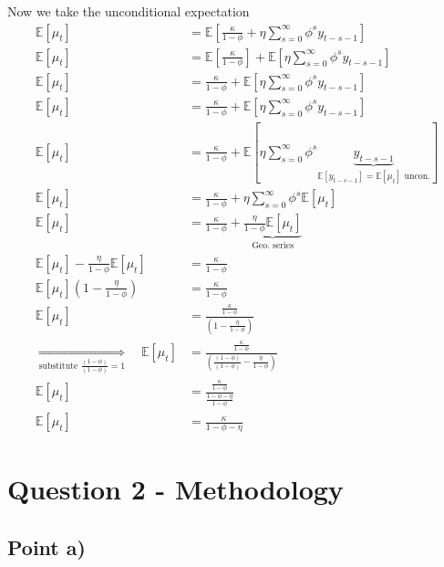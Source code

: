 \documentclass{article}
\begin{document}
Now we take the unconditional expectation
\begin{align*}
\mathbb{E}\left[\mu_{t}\right] & =\mathbb{E}\left[\frac{\kappa}{1-\phi}+\eta\sum_{s=0}^{\infty}\phi^{s}y_{t-s-1}\right]\\
\mathbb{E}\left[\mu_{t}\right] & =\mathbb{E}\left[\frac{\kappa}{1-\phi}\right]+\mathbb{E}\left[\eta\sum_{s=0}^{\infty}\phi^{s}y_{t-s-1}\right]\\
\mathbb{E}\left[\mu_{t}\right] & =\frac{\kappa}{1-\phi}+\mathbb{E}\left[\eta\sum_{s=0}^{\infty}\phi^{s}y_{t-s-1}\right]\\
\mathbb{E}\left[\mu_{t}\right] & =\frac{\kappa}{1-\phi}+\mathbb{E}\left[\eta\sum_{s=0}^{\infty}\phi^{s}y_{t-s-1}\right]\\
\mathbb{E}\left[\mu_{t}\right] & =\frac{\kappa}{1-\phi}+\mathbb{E}\left[\eta\sum_{s=0}^{\infty}\phi^{s}\underbrace{y_{t-s-1}}_{\mathbb{E}\left[y_{t-s-1}\right]=\mathbb{E}\left[\mu_{t}\right]\text{ uncon.}}\right]\\
\mathbb{E}\left[\mu_{t}\right] & =\frac{\kappa}{1-\phi}+\eta\sum_{s=0}^{\infty}\phi^{s}\mathbb{E}\left[\mu_{t}\right]\\
\mathbb{E}\left[\mu_{t}\right] & =\frac{\kappa}{1-\phi}+\underbrace{\frac{\eta}{1-\phi}\mathbb{E}\left[\mu_{t}\right]}_{\text{Geo. series}}\\
\mathbb{E}\left[\mu_{t}\right]-\frac{\eta}{1-\phi}\mathbb{E}\left[\mu_{t}\right] & =\frac{\kappa}{1-\phi}\\
\mathbb{E}\left[\mu_{t}\right]\left(1-\frac{\eta}{1-\phi}\right) & =\frac{\kappa}{1-\phi}\\
\mathbb{E}\left[\mu_{t}\right] & =\frac{\frac{\kappa}{1-\phi}}{\left(1-\frac{\eta}{1-\phi}\right)}\\
\underset{\text{substitute }\frac{\left(1-\phi\right)}{\left(1-\phi\right)}=1}{\Longrightarrow}\quad\mathbb{E}\left[\mu_{t}\right] & =\frac{\frac{\kappa}{1-\phi}}{\left(\frac{\left(1-\phi\right)}{\left(1-\phi\right)}-\frac{\eta}{1-\phi}\right)}\\
\mathbb{E}\left[\mu_{t}\right] & =\frac{\frac{\kappa}{1-\phi}}{\frac{1-\phi-\eta}{1-\phi}}\\
\mathbb{E}\left[\mu_{t}\right] & =\frac{\kappa}{1-\phi-\eta}
\end{align*}


\section{Question 2 - Methodology}

\subsection{Point a)}
\end{document}
